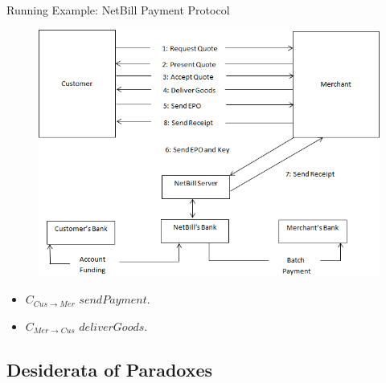 \documentclass{beamer}
\begin{document}
\begin{frame}{Running Example: NetBill Payment Protocol}
%
\begin{figure}[htbp]
\centering
\includegraphics[width=.75 \columnwidth]{figures/figure1.png}
\end{figure}
\begin{itemize}
\item $C_{Cus \rightarrow Mer}$ $sendPayment$.
 \item $C_{Mer \rightarrow Cus}$ $deliverGoods$.
 \end{itemize}
\end{frame}

\subsection{Desiderata of Paradoxes}
\end{document}
